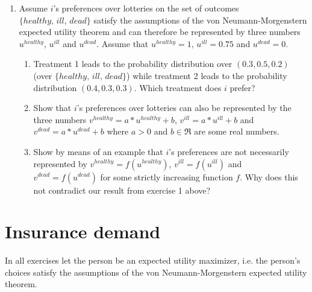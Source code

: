 \documentclass[a4paper]{article}
\begin{document}
\begin{enumerate}
\item Assume \(i\)'s preferences over lotteries on the set of outcomes \(\{healthy,\,ill,\,dead\}\) satisfy the assumptions of the von Neumann-Morgenstern expected utility theorem and can therefore be represented by three numbers \(u^{healthy},\,u^{ill}\) and \(u^{dead}\). Assume that  \(u^{healthy}=1,\,u^{ill}=0.75\) and \(u^{dead}=0\).
\begin{enumerate}
\item Treatment 1 leads to the probability distribution over \((0.3,0.5,0.2)\) (over \(\{healthy,\,ill,\,dead\}\)) while treatment 2 leads to the probability distribution \((0.4,0.3,0.3)\). Which treatment does \(i\) prefer?
\item Show that \(i\)'s preferences over lotteries can also be represented by the three numbers \(v^{healthy}=a*u^{healthy}+b\), \(v^{ill}=a*u^{ill}+b\) and \(v^{dead}=a*u^{dead}+b\) where \(a>0\) and \(b\in\Re\) are some real numbers.
\item Show by means of an example that \(i\)'s preferences are not necessarily represented by \(v^{healthy}=f(u^{healthy})\), \(v^{ill}=f(u^{ill})\) and \(v^{dead}=f(u^{dead})\) for some strictly increasing function \(f\). Why does this not contradict our result from exercise 1 above?
\end{enumerate}
\end{enumerate}

\section{Insurance demand}
\label{sec:orgfeb2401}
In all exercises let the person be an expected utility maximizer, i.e. the person's choices satisfy the assumptions of the von Neumann-Morgenstern expected utility theorem.
\end{document}
